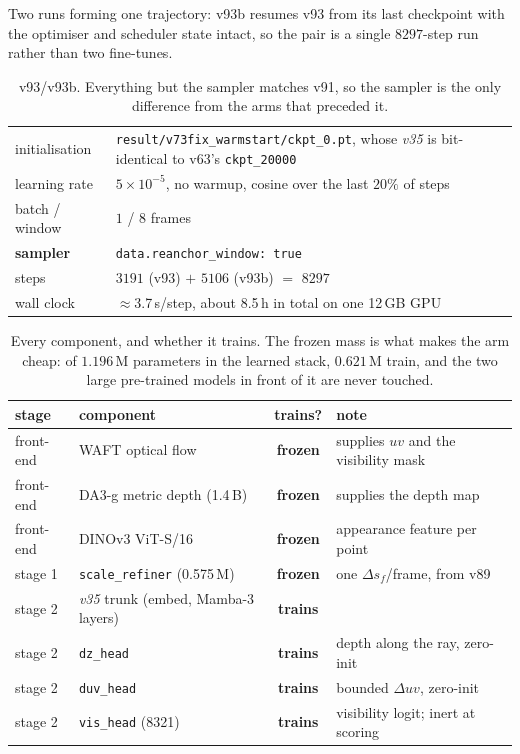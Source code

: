\documentclass[11pt,a4paper]{article}
\begin{document}
Two runs forming one trajectory: v93b resumes v93 from its last checkpoint with the optimiser and
scheduler state intact, so the pair is a single $8297$-step run rather than two fine-tunes.

\begin{table}[h]
\centering
\caption{v93/v93b. Everything but the sampler matches v91, so the sampler is the only difference
from the arms that preceded it.}
\label{tab:v93-protocol}
\begin{tabular}{ll}
\toprule
initialisation & \texttt{result/v73fix\_warmstart/ckpt\_0.pt}, whose \emph{v35} is bit-identical
                 to v63's \texttt{ckpt\_20000} \\
learning rate & $5\times10^{-5}$, no warmup, cosine over the last $20\%$ of steps \\
batch / window & $1$ / $8$ frames \\
\textbf{sampler} & \texttt{data.reanchor\_window: true} \\
steps & $3191$ (v93) $+$ $5106$ (v93b) $=$ $8297$ \\
wall clock & $\approx$3.7\,s/step, about 8.5\,h in total on one 12\,GB GPU \\
\bottomrule
\end{tabular}
\end{table}

\begin{table}[h]
\centering
\caption{Every component, and whether it trains. The frozen mass is what makes the arm cheap: of
$1.196$\,M parameters in the learned stack, $0.621$\,M train, and the two large pre-trained models
in front of it are never touched.}
\label{tab:v93-freeze}
\begin{tabular}{llcl}
\toprule
stage & component & trains? & note \\
\midrule
front-end & WAFT optical flow & \textbf{frozen} & supplies $uv$ and the visibility mask \\
front-end & DA3-g metric depth (1.4\,B) & \textbf{frozen} & supplies the depth map \\
front-end & DINOv3 ViT-S/16 & \textbf{frozen} & appearance feature per point \\
\midrule
stage 1 & \texttt{scale\_refiner} (0.575\,M) & \textbf{frozen} & one $\Delta s_f$/frame, from v89 \\
\midrule
stage 2 & \emph{v35} trunk (embed, Mamba-3 layers) & \textbf{trains} & \\
stage 2 & \quad \texttt{dz\_head} & \textbf{trains} & depth along the ray, zero-init \\
stage 2 & \quad \texttt{duv\_head} & \textbf{trains} & bounded $\Delta uv$, zero-init \\
stage 2 & \quad \texttt{vis\_head} (8321) & \textbf{trains} & visibility logit; inert at scoring \\
\bottomrule
\end{tabular}
\end{table}
\end{document}
